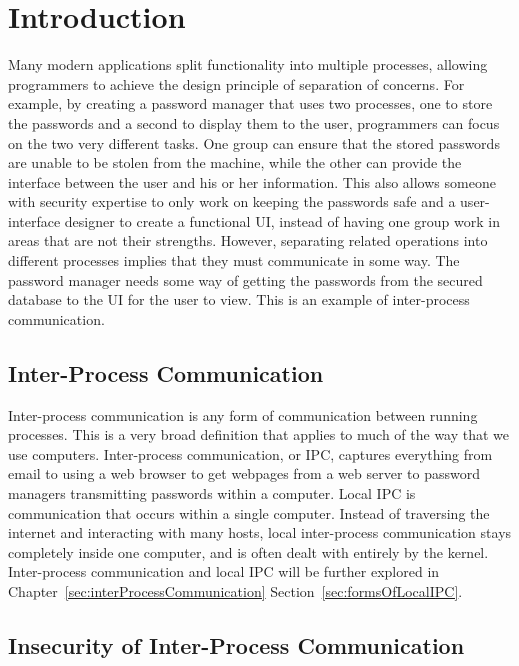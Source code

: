 \chapter{Introduction}
\label{sec:intro}

Many modern applications split functionality into multiple processes, allowing programmers to achieve the design principle of separation of concerns.  For example, by creating a password manager that uses two processes, one to store the passwords and a second to display them to the user, programmers can focus on the two very different tasks.  One group can ensure that the stored passwords are unable to be stolen from the machine, while the other can provide the interface between the user and his or her information.  This also allows someone with security expertise to only work on keeping the passwords safe and a user-interface designer to create a functional UI, instead of having one group work in areas that are not their strengths.  However, separating related operations into different processes implies that they must communicate in some way.  The password manager needs some way of getting the passwords from the secured database to the UI for the user to view.  This is an example of inter-process communication.

\section{Inter-Process Communication}
\label{sec:ipcIntro}
Inter-process communication is any form of communication between running processes.  This is a very broad definition that applies to much of the way that we use computers.  Inter-process communication, or IPC, captures everything from email to using a web browser to get webpages from a web server to password managers transmitting passwords within a computer.  Local IPC is communication that occurs within a single computer.  Instead of traversing the internet and interacting with many hosts, local inter-process communication stays completely inside one computer, and is often dealt with entirely by the kernel.  Inter-process communication and local IPC will be further explored in Chapter~\ref{sec:interProcessCommunication} Section~\ref{sec:formsOfLocalIPC}.

\section{Insecurity of Inter-Process Communication}
\label{sec:ipcInsecurity}
